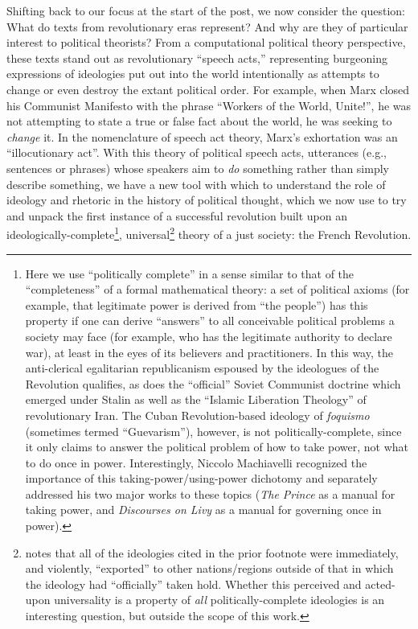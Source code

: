 Shifting back to our focus at the start of the post, we now consider the question: What do texts from revolutionary eras represent? And why are they of particular interest to political theorists? From a computational political theory perspective, these texts stand out as revolutionary ``speech acts,'' representing burgeoning expressions of ideologies put out into the world intentionally as attempts to change or even destroy the extant political order. For example, when Marx closed his Communist Manifesto with the phrase ``Workers of the World, Unite!'', he was not attempting to state a true or false fact about the world, he was seeking to \textit{change} it. In the nomenclature of speech act theory, Marx's exhortation was an ``illocutionary act''. With this theory of political speech acts, utterances (e.g., sentences or phrases) whose speakers aim to \textit{do} something rather than simply describe something, we have a new tool with which to understand the role of ideology and rhetoric in the history of political thought, which we now use to try and unpack the first instance of a successful revolution built upon an ideologically-complete\footnote{Here we use ``politically complete'' in a sense similar to that of the ``completeness'' of a formal mathematical theory: a set of political axioms (for example, that legitimate power is derived from ``the people'') has this property if one can derive ``answers'' to all conceivable political problems a society may face (for example, who has the legitimate authority to declare war), at least in the eyes of its believers and practitioners. In this way, the anti-clerical egalitarian republicanism espoused by the ideologues of the Revolution qualifies, as does the ``official'' Soviet Communist doctrine which emerged under Stalin as well as the ``Islamic Liberation Theology'' of revolutionary Iran. The Cuban Revolution-based ideology of \textit{foquismo} (sometimes termed ``Guevarism''), however, is not politically-complete, since it only claims to answer the political problem of how to take power, not what to do once in power. Interestingly, Niccolo Machiavelli recognized the importance of this taking-power/using-power dichotomy and separately addressed his two major works to these topics (\textit{The Prince} as a manual for taking power, and \textit{Discourses on Livy} as a manual for governing once in power).}, universal\footnote{\cite{halliday_revolution_1999} notes that all of the ideologies cited in the prior footnote were immediately, and violently, ``exported'' to other nations/regions outside of that in which the ideology had ``officially'' taken hold. Whether this perceived and acted-upon universality is a property of \textit{all} politically-complete ideologies is an interesting question, but outside the scope of this work.} theory of a just society: the French Revolution.

